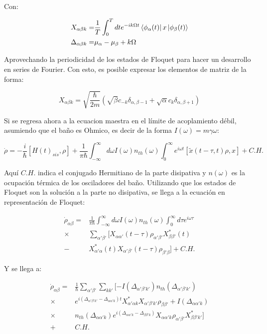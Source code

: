 \documentclass[a4paper,10pt]{report}
\begin{document}
Con:

\begin{align*}
X_{\alpha\beta k} =& \frac{1}{T} \int_0^T dt e^{-ik\Omega t}\Bra{\phi_{\alpha}(t)}x\Ket{\phi_{\beta}(t)} \\
\Delta_{\alpha \beta k} =& \mu_{\alpha}-\mu_{\beta} + k\Omega
\end{align*}

Aprovechando la periodicidad de los estados de Floquet para hacer un desarrollo en series de Fourier. Con esto, es posible expresar los elementos de matriz de la forma:

\begin{equation}
X_{\alpha\beta k} = \sqrt{\frac{\hbar}{2m}}(\sqrt{\beta}c_{-k} \delta_{\alpha,\beta-1}+\sqrt{\alpha}c_k\delta_{\alpha,\beta+1})
\end{equation}

Si se regresa ahora a la ecuacion maestra en el límite de acoplamiento débil, asumiendo que el baño es Ohmico, es decir de la forma $I(\omega) = m\gamma \omega$:

\begin{equation}
\dot{\rho} = -\frac{i}{\hbar}[H(t)_{sis},\rho] + \frac{1}{\pi \hbar} \int_{-\infty}^\infty d\omega I(\omega)n_{th}(\omega)\int_0^\infty e^{i\omega t}[\tilde{x}(t-\tau,t)\rho,x] + C.H.
\end{equation}

Aquí $C.H.$ indica el conjugado Hermitiano de la parte disipativa y $n(\omega)$ es la ocupación térmica de los osciladores del baño. Utilizando que los estados de Floquet son la solución a la parte no disipativa, se llega a la ecuación en representación de Floquet:

\begin{align*}
\dot{\rho}_{\alpha \beta} =& \frac{1}{\pi \hbar} \int_{-\infty}^\infty d\omega I(\omega)n_{th}(\omega) \int_0 ^{\infty} d\tau e^{i\omega \tau} \\
 \times & \sum_{\alpha' \beta '} [X_{\alpha \alpha'}(t-\tau)\rho_{\alpha' \beta'}X^* _{\beta \beta'}(t)\\
 -& X^* _{\alpha' \alpha}(t) X_{\alpha' \beta'}(t-\tau)\rho_{\beta' \beta}] + C.H.
\end{align*}

Y se llega a:

\begin{align*}
\dot{\rho}_{\alpha \beta} =& \frac{1}{\hbar} \sum_{\alpha' \beta'}\sum_{k k'}[-I(\Delta_{\alpha' \beta' k'}) n_{th} (\Delta_{\alpha' \beta' k'})\\
\times & e^{i(\Delta_{\alpha' \beta' k'}-\Delta_{\alpha \alpha' k})t} X^*_{\alpha' \alpha k}X_{\alpha' \beta' k'}\rho_{\beta \beta'} + I(\Delta_{\alpha \alpha' k})\\
\times & n_{th}(\Delta_{\alpha \alpha' k}) e^{i(\Delta_{\alpha \alpha' k}-\Delta_{\beta \beta' k})}X_{\alpha \alpha' k} \rho_{\alpha' \beta'}X^*_{\beta \beta' k'}]\\
+& C. H.  
\end{align*}
\end{document}
